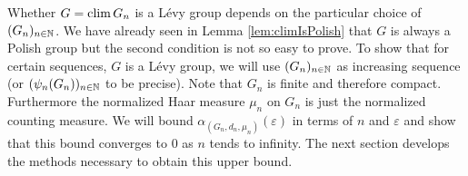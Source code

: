 Whether $G=\operatorname{clim} G_n$ is a L\'evy group depends on the particular choice of $(G_n)_{n\in\mathbb{N}}$. We have already seen in Lemma \ref{lem:climIsPolish} that $G$ is always a Polish group but the second condition is not so easy to prove.
To show that for certain sequences, $G$ is a L\'evy group, we will use $(G_n)_{n\in\mathbb{N}}$ as increasing sequence (or $(\psi_n(G_n))_{n\in\mathbb{N}}$ to be precise). Note that $G_n$ is finite and therefore compact. Furthermore the normalized Haar measure $\mu_n$ on $G_n$ is just the normalized counting measure. We will bound $\alpha_{(G_n,d_n,\mu_n)}(\varepsilon)$ in terms of $n$ and $\varepsilon$ and show that this bound converges to 0 as $n$ tends to infinity. 
The next section develops the methods necessary to obtain this upper bound.

